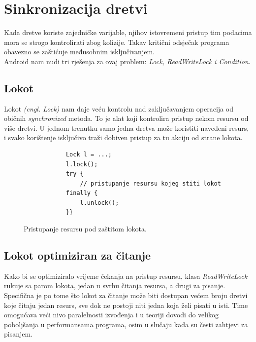 \documentclass[times, utf8, zavrsni]{fer}
\begin{document}
\section{Sinkronizacija dretvi}
\paragraph{}
Kada dretve koriste zajedničke varijable, njihov istovremeni pristup tim podacima mora se strogo kontrolirati zbog kolizije. Takav kritični odsječak programa obavezno se zaštićuje međusobnim isključivanjem.\\

Android nam nudi tri rješenja za ovaj problem: \textit{Lock, ReadWriteLock i Condition}.

\subsection{Lokot}
Lokot \textit{(engl. Lock)} nam daje veću kontrolu nad zaključavanjem operacija od običnih \textit{synchronized} metoda. To je alat koji kontrolira pristup nekom resursu od više dretvi. U jednom trenutku samo jedna dretva može koristiti navedeni resurs, i svako korištenje isključivo traži dobiven pristup za tu akciju od strane lokota.

\begin{figure}[ht!]
\begin{lstlisting}
 			Lock l = ...;
 			l.lock();
 			try {
   				// pristupanje resursu kojeg stiti lokot
		  	finally {
		   		l.unlock();
 			}}
\end{lstlisting}
\caption{Pristupanje resursu pod zaštitom lokota.}
\label{overflow}
\end{figure}

\subsection{Lokot optimiziran za čitanje}
Kako bi se optimiziralo vrijeme čekanja na pristup resursu, klasa \textit{ReadWriteLock} rukuje sa parom lokota, jedan u svrhu čitanja resursa, a drugi za pisanje. Specifična je po tome što lokot za čitanje može biti dostupan većem broju dretvi koje čitaju jedan resurs, sve dok ne postoji niti jedna koja želi pisati u isti.
Time omogućava veći nivo paralelnosti izvođenja i u teoriji dovodi do velikog poboljšanja u performansama programa, osim u slučaju kada su česti zahtjevi za pisanjem.
\end{document}

